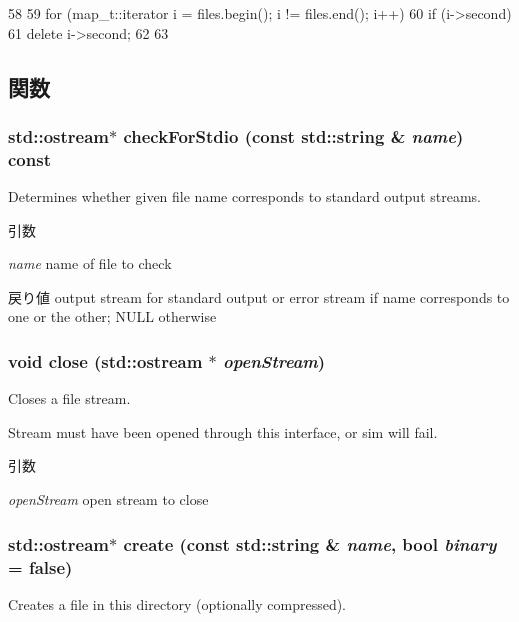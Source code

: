 \begin{DoxyCode}
58 {
59     for (map_t::iterator i = files.begin(); i != files.end(); i++) {
60         if (i->second)
61             delete i->second;
62     }
63 }
\end{DoxyCode}


\subsection{関数}
\hypertarget{classOutputDirectory_ab4edf1444be4d8d0a64a0361e1f555d9}{
\subsubsection[{checkForStdio}]{\setlength{\rightskip}{0pt plus 5cm}std::ostream$\ast$ checkForStdio (const std::string \& {\em name}) const}}
\label{classOutputDirectory_ab4edf1444be4d8d0a64a0361e1f555d9}
Determines whether given file name corresponds to standard output streams.


\begin{DoxyParams}{引数}
\item[{\em name}]name of file to check \end{DoxyParams}
\begin{DoxyReturn}{戻り値}
output stream for standard output or error stream if name corresponds to one or the other; NULL otherwise 
\end{DoxyReturn}
\hypertarget{classOutputDirectory_a3cc929ea4ca094903ac826046d510634}{
\subsubsection[{close}]{\setlength{\rightskip}{0pt plus 5cm}void close (std::ostream $\ast$ {\em openStream})}}
\label{classOutputDirectory_a3cc929ea4ca094903ac826046d510634}
Closes a file stream.

Stream must have been opened through this interface, or sim will fail.


\begin{DoxyParams}{引数}
\item[{\em openStream}]open stream to close \end{DoxyParams}
\hypertarget{classOutputDirectory_a22e4aa8ec29a265a1c299a1a009c85cc}{
\subsubsection[{create}]{\setlength{\rightskip}{0pt plus 5cm}std::ostream$\ast$ create (const std::string \& {\em name}, \/  bool {\em binary} = {\ttfamily false})}}
\label{classOutputDirectory_a22e4aa8ec29a265a1c299a1a009c85cc}
Creates a file in this directory (optionally compressed).

